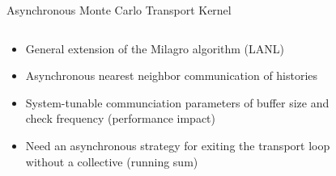 \documentclass{beamer}
\begin{document}
\begin{frame}{Asynchronous Monte Carlo Transport Kernel}

  \begin{columns}

    \begin{column}{0.5\textwidth}
      \vspace{-0.1in}
      \small
      \begin{itemize}
      \item General extension of the Milagro algorithm (LANL)
      \item Asynchronous nearest neighbor communication of histories
      \item System-tunable communciation parameters of buffer size and check
        frequency (performance impact)
      \item Need an asynchronous strategy for exiting the transport loop
        without a collective (running sum)
      \end{itemize}

      \vspace{-0.1in}
      \begin{figure}[htpb!]
        \begin{center}
          \scalebox{0.45}{  }
        \end{center}
      \end{figure}

    \end{column}

    \begin{column}{0.5\textwidth}

      \vspace{-0.3in}
      \begin{figure}[htpb!]
        \begin{center}
          \scalebox{0.85}{  }
        \end{center}
      \end{figure}

    \end{column}

  \end{columns}

\end{frame}
\end{document}
